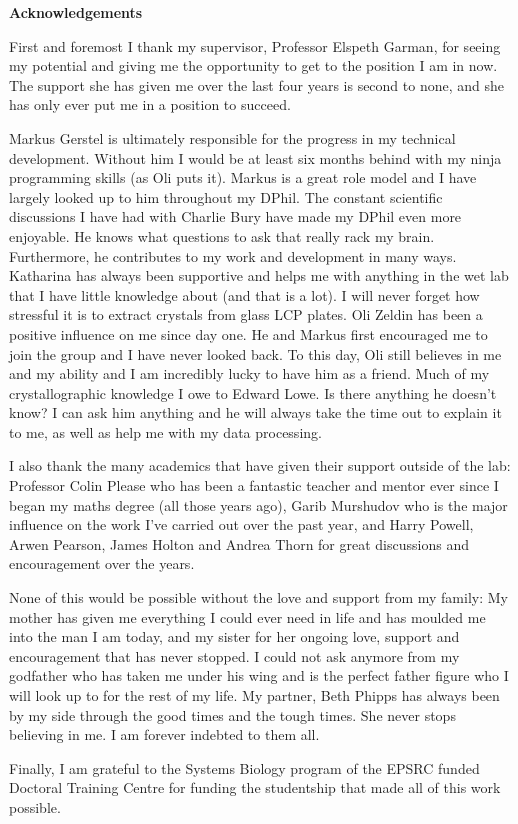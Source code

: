 \newenvironment{acknowledgements}%
{\cleardoublepage\thispagestyle{empty}\null\vfill\begin{center}%
\bfseries Acknowledgements\end{center}}%
{\vfill\null}
\begin{acknowledgements}
\small
\singlespacing
First and foremost I thank my supervisor, Professor Elspeth Garman, for seeing my potential and giving me the opportunity to get to the position I am in now.
The support she has given me over the last four years is second to none, and she has only ever put me in a position to succeed.

Markus Gerstel is ultimately responsible for the progress in my technical development.
Without him I would be at least six months behind with my ninja programming skills (as Oli puts it).
Markus is a great role model and I have largely looked up to him throughout my DPhil.
The constant scientific discussions I have had with Charlie Bury have made my DPhil even more enjoyable.
He knows what questions to ask that really rack my brain.
Furthermore, he contributes to my work and development in many ways.
Katharina has always been supportive and helps me with anything in the wet lab that I have little knowledge about (and that is a lot).
I will never forget how stressful it is to extract crystals from glass LCP plates.
Oli Zeldin has been a positive influence on me since day one.
He and Markus first encouraged me to join the group and I have never looked back.
To this day, Oli still believes in me and my ability and I am incredibly lucky to have him as a friend.
Much of my crystallographic knowledge I owe to Edward Lowe.
Is there anything he doesn't know?
I can ask him anything and he will always take the time out to explain it to me, as well as help me with my data processing.

I also thank the many academics that have given their support outside of the lab:
Professor Colin Please who has been a fantastic teacher and mentor ever since I began my maths degree (all those years ago), Garib Murshudov who is the major influence on the work I've carried out over the past year, and Harry Powell, Arwen Pearson, James Holton and Andrea Thorn for great discussions and encouragement over the years.

None of this would be possible without the love and support from my family:
My mother has given me everything I could ever need in life and has moulded me into the man I am today, and my sister for her ongoing love, support and encouragement that has never stopped.
I could not ask anymore from my godfather who has taken me under his wing and is the perfect father figure who I will look up to for the rest of my life.
My partner, Beth Phipps has always been by my side through the good times and the tough times.
She never stops believing in me.
I am forever indebted to them all.

Finally, I am grateful to the Systems Biology program of the EPSRC funded Doctoral Training Centre for funding the studentship that made all of this work possible.
\end{acknowledgements}
